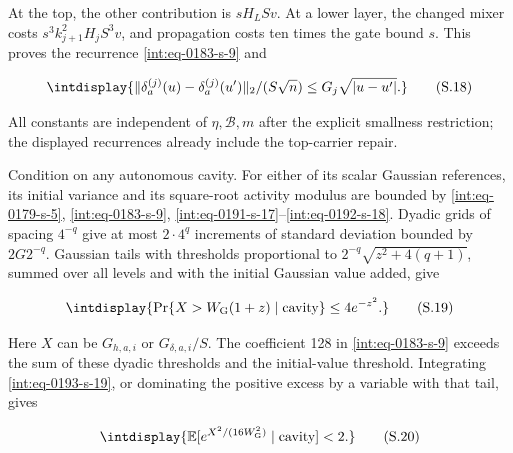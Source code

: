 
At the top, the other contribution is \(sH_LSv\). At a lower layer, the changed mixer costs \(s^3k_{j+1}^2H_jS^3v\), and propagation costs ten times the gate bound \(s\). This proves the recurrence \eqref{int:eq-0183-s-9} and


\begingroup\renewcommand{\theHequation}{intdisplay.392}
\begin{equation}
\intdisplay{
\|\delta_a^{(j)}(u)-\delta_a^{(j)}(u')\|_2/(S\sqrt n)
\le G_j\sqrt{|u-u'|}.
}
\tag{S.18}
\label{int:eq-0192-s-18}
\end{equation}
\endgroup


All constants are independent of \(\eta,\allowbreak \mathcal B,\allowbreak m\) after the explicit smallness restriction; the displayed recurrences already include the top-carrier repair.



Condition on any autonomous cavity. For either of its scalar Gaussian references, its initial variance and its square-root activity modulus are bounded by \eqref{int:eq-0179-s-5}, \eqref{int:eq-0183-s-9}, \eqref{int:eq-0191-s-17}--\allowbreak \eqref{int:eq-0192-s-18}. Dyadic grids of spacing \(4^{-q}\) give at most \(2\cdot4^q\) increments of standard deviation bounded by \(2G2^{-q}\). Gaussian tails with thresholds proportional to \(2^{-q}\sqrt{z^2+4(q+1)}\), summed over all levels and with the initial Gaussian value added, give


\begingroup\renewcommand{\theHequation}{intdisplay.393}
\begin{equation}
\intdisplay{
\Pr\{X>W_{\rm G}(1+z)\mid\text{cavity}\}\le4e^{-z^2}.
}
\tag{S.19}
\label{int:eq-0193-s-19}
\end{equation}
\endgroup


Here \(X\) can be \(G_{h,\allowbreak a,\allowbreak i}\) or \(G_{\delta,\allowbreak a,\allowbreak i}/S\). The coefficient 128 in \eqref{int:eq-0183-s-9} exceeds the sum of these dyadic thresholds and the initial-value threshold. Integrating \eqref{int:eq-0193-s-19}, or dominating the positive excess by a variable with that tail, gives


\begingroup\renewcommand{\theHequation}{intdisplay.394}
\begin{equation}
\intdisplay{
\mathbb E[e^{X^2/(16W_{\rm G}^2)}\mid\text{cavity}]<2.
}
\tag{S.20}
\label{int:eq-0194-s-20}
\end{equation}
\endgroup

